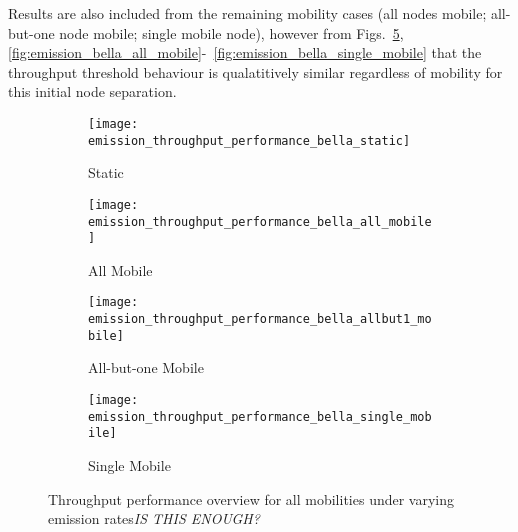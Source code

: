 Results are also included from the remaining mobility cases (all nodes mobile; all-but-one node mobile; single mobile node), however from Figs.~\ref{fig:emission_all},~ \ref{fig:emission_bella_all_mobile}-~\ref{fig:emission_bella_single_mobile} that the throughput threshold behaviour is qualatitively similar regardless of mobility for this initial node separation.


\begin{figure}[h]
  \begin{subfigure}[t]{0.5\textwidth}
    \centering
    \texttt{[image: emission\_throughput\_performance\_bella\_static]}
    \caption{Static}
    \label{fig:emission_throughput_performance_sum_bella_static}
  \end{subfigure}
  \begin{subfigure}[t]{0.5\textwidth}
    \centering
    \texttt{[image: emission\_throughput\_performance\_bella\_all\_mobile]}
    \caption{All Mobile}
    \label{fig:emission_throughput_performance_sum_bella_all_mobile}
  \end{subfigure}  
  
  \begin{subfigure}[t]{0.5\textwidth}
    \centering
    \texttt{[image: emission\_throughput\_performance\_bella\_allbut1\_mobile]}
    \caption{All-but-one Mobile}
    \label{fig:emission_throughput_performance_sum_bella_allbut1_mobile}
  \end{subfigure}  
  \begin{subfigure}[t]{0.5\textwidth}
    \centering
    \texttt{[image: emission\_throughput\_performance\_bella\_single\_mobile]}
    \caption{Single Mobile}
    \label{fig:emission_throughput_performance_sum_bella_single_mobile}
  \end{subfigure}
  \caption{Throughput performance overview for all mobilities under varying emission rates\emph{IS THIS ENOUGH?}}
  \label{fig:emission_all}
\end{figure}


